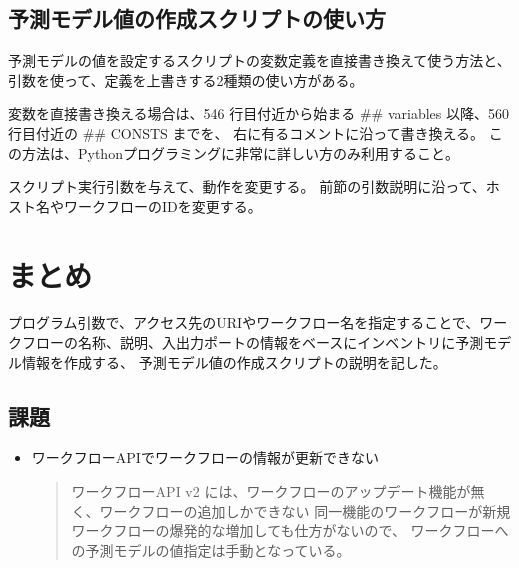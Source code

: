 \documentclass[letterpaper,10pt,dvipdfmx,openany]{sphinxmanual}
\begin{document}
\subsection{予測モデル値の作成スクリプトの使い方}
\label{\detokenize{doc/20200218_How2Use_predict_conf_upload:id7}}
予測モデルの値を設定するスクリプトの変数定義を直接書き換えて使う方法と、
引数を使って、定義を上書きする2種類の使い方がある。

変数を直接書き換える場合は、546 行目付近から始まる \#\# variables 以降、560行目付近の \#\# CONSTS までを、
右に有るコメントに沿って書き換える。
この方法は、Pythonプログラミングに非常に詳しい方のみ利用すること。

スクリプト実行引数を与えて、動作を変更する。
前節の引数説明に沿って、ホスト名やワークフローのIDを変更する。

\begin{sphinxVerbatim}[commandchars=\\\{\}]
\end{sphinxVerbatim}


\section{まとめ}
\label{\detokenize{doc/20200218_How2Use_predict_conf_upload:id8}}
プログラム引数で、アクセス先のURIやワークフロー名を指定することで、ワークフローの名称、説明、入出力ポートの情報をベースにインベントリに予測モデル情報を作成する、
予測モデル値の作成スクリプトの説明を記した。


\subsection{課題}
\label{\detokenize{doc/20200218_How2Use_predict_conf_upload:id9}}\begin{itemize}
\item {} 
ワークフローAPIでワークフローの情報が更新できない
\begin{quote}

ワークフローAPI v2 には、ワークフローのアップデート機能が無く、ワークフローの追加しかできない
同一機能のワークフローが新規ワークフローの爆発的な増加しても仕方がないので、
ワークフローへの予測モデルの値指定は手動となっている。
\end{quote}

\end{itemize}



\renewcommand{\indexname}{索引}
\printindex
\end{document}
